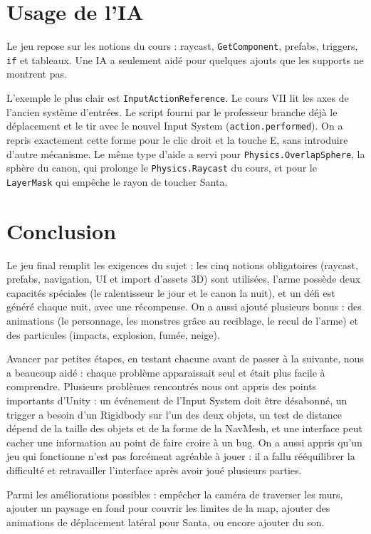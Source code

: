 \documentclass[11pt,a4paper]{article}
\begin{document}
\section{Usage de l'IA}

Le jeu repose sur les notions du cours : raycast, \texttt{GetComponent}, prefabs, triggers, \texttt{if} et tableaux. Une IA a seulement aidé pour quelques ajouts que les supports ne montrent pas.

L'exemple le plus clair est \texttt{InputActionReference}. Le cours VII lit les axes de l'ancien système d'entrées. Le script fourni par le professeur branche déjà le déplacement et le tir avec le nouvel Input System (\texttt{action.performed}). On a repris exactement cette forme pour le clic droit et la touche E, sans introduire d'autre mécanisme. Le même type d'aide a servi pour \texttt{Physics.OverlapSphere}, la sphère du canon, qui prolonge le \texttt{Physics.Raycast} du cours, et pour le \texttt{LayerMask} qui empêche le rayon de toucher Santa.

\section{Conclusion}
Le jeu final remplit les exigences du sujet : les cinq notions obligatoires (raycast, prefabs, navigation, UI et import d'assets 3D) sont utilisées, l'arme possède deux capacités spéciales (le ralentisseur le jour et le canon la nuit), et un défi est généré chaque nuit, avec une récompense. On a aussi ajouté plusieurs bonus : des animations (le personnage, les monstres grâce au reciblage, le recul de l'arme) et des particules (impacts, explosion, fumée, neige).

Avancer par petites étapes, en testant chacune avant de passer à la suivante, nous a beaucoup aidé : chaque problème apparaissait seul et était plus facile à comprendre. Plusieurs problèmes rencontrés nous ont appris des points importants d'Unity : un événement de l'Input System doit être désabonné, un trigger a besoin d'un Rigidbody sur l'un des deux objets, un test de distance dépend de la taille des objets et de la forme de la NavMesh, et une interface peut cacher une information au point de faire croire à un bug. On a aussi appris qu'un jeu qui fonctionne n'est pas forcément agréable à jouer : il a fallu rééquilibrer la difficulté et retravailler l'interface après avoir joué plusieurs parties.

Parmi les améliorations possibles : empêcher la caméra de traverser les murs, ajouter un paysage en fond pour couvrir les limites de la map, ajouter des animations de déplacement latéral pour Santa, ou encore ajouter du son.
\end{document}
